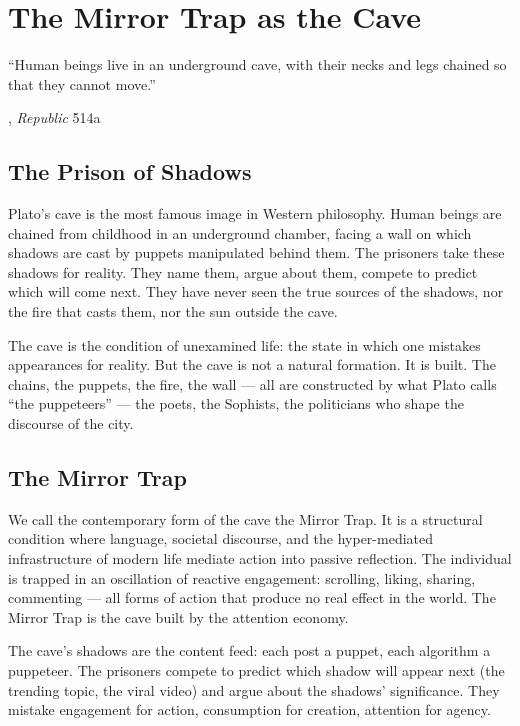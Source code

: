 \chapter{The Mirror Trap as the Cave}

\epigraph{``Human beings live in an underground cave, with their necks and legs
chained so that they cannot move.''}{\textcite{plato1997complete}, \emph{Republic} 514a}

\section{The Prison of Shadows}

Plato's cave is the most famous image in Western philosophy. Human beings are
chained from childhood in an underground chamber, facing a wall on which
shadows are cast by puppets manipulated behind them. The prisoners take these
shadows for reality. They name them, argue about them, compete to predict which
will come next. They have never seen the true sources of the shadows, nor the
fire that casts them, nor the sun outside the cave.

The cave is the condition of unexamined life: the state in which one mistakes
appearances for reality. But the cave is not a natural formation. It is built.
The chains, the puppets, the fire, the wall --- all are constructed by what
Plato calls ``the puppeteers'' --- the poets, the Sophists, the politicians who
shape the discourse of the city.

\section{The Mirror Trap}

We call the contemporary form of the cave the Mirror Trap. It is a structural
condition where language, societal discourse, and the hyper-mediated
infrastructure of modern life mediate action into passive reflection. The
individual is trapped in an oscillation of reactive engagement: scrolling,
liking, sharing, commenting --- all forms of action that produce no real effect
in the world. The Mirror Trap is the cave built by the attention economy.

The cave's shadows are the content feed: each post a puppet, each algorithm a
puppeteer. The prisoners compete to predict which shadow will appear next (the
trending topic, the viral video) and argue about the shadows' significance.
They mistake engagement for action, consumption for creation, attention for
agency.

